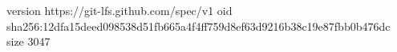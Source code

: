 version https://git-lfs.github.com/spec/v1
oid sha256:12dfa15deed098538d51fb665a4f4ff759d8ef63d9216b38c19e87fbb0b476dc
size 3047

